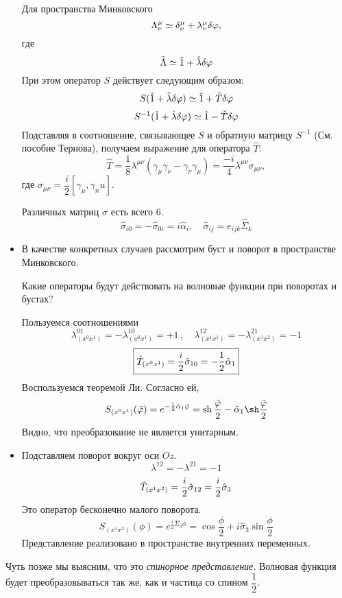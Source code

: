 \begin{itemize}
  Для пространства Минковского
  $$
    \Lambda_\nu^{\mu} \simeq \delta_\nu^{\mu} + \lambda_\nu^{\mu} \delta \varphi,
  $$
  где
  $$
    \hat \Lambda \simeq \hat 1 + \hat \lambda \delta \varphi
  $$
  При этом оператор $S$ действует следующим образом:
  $$
    S(\hat 1 + \hat \lambda \delta \varphi) \simeq \hat 1 + \hat T \delta \varphi
  $$
  $$
    S^{-1} (\hat 1 + \hat \lambda \delta \varphi) \simeq \hat 1 - \hat T \delta \varphi
  $$
  Подставляя в соотношение, связывающее $S$ и обратную матрицу $S^{-1}$ (См. пособие Тернова), получаем выражение для оператора $\hat T$:
  $$
    \hat T = \dfrac{1}{8} \lambda^{\mu\nu}
    (\gamma_\mu \gamma_\nu - \gamma_\nu \gamma_\mu) = \dfrac{-i}{4} \lambda^{\mu \nu} \sigma_{\mu \nu},
  $$
  где $\sigma_{\mu \nu} = \dfrac{i}{2}[\gamma_\mu, \gamma_nu]$.
  
  Различных матриц $\sigma$ есть всего 6.
  $$
    \hat \sigma_{i0} = - \hat \sigma_{0i} = i \hat \alpha_i, \quad \hat \sigma_{ij} = e_{ijk} \hat \Sigma_k
  $$
  \item В качестве конкретных случаев рассмотрим буст и поворот в пространстве Минковского.
  
  Какие операторы будут действовать на волновые функции при поворотах и бустах?
  
  Пользуемся соотношениями
  $$
    \boxed{
        \lambda_{(x^0 x^1)}^{01} = - \lambda_{(x^0 x^1)}^{10} = +1
    } \, , \quad 
    \boxed{
        \lambda_{(x^1 x^1)}^{12} = - \lambda_{(x^1 x^2)}^{21} = -1
    }
  $$
  $$
  \boxed{
    \Hat T_{(x^0 x^1)} = \dfrac{i}{2} \hat \sigma_{10} = -\dfrac{1}{2} \hat \alpha_1
  }
  $$
  Воспользуемся теоремой Ли. Согласно ей,
  $$
    S_{(x^0 x^1)} (\tilde \phi) = e^{-\frac{1}{2} \hat \alpha_1 \tilde \phi} = \ch \dfrac{\tilde \phi}{2}- \hat \alpha_1 \sh \dfrac{\tilde \phi}{2}
  $$
  Видно, что преобразование не является унитарным.
  \item Подставляем поворот вокруг оси $Oz$.
  $$
    \lambda^{12} = - \lambda^{21} = -1
  $$
  $$
    \Hat T_{(x^1 x^2)} = \dfrac{i}{2} \hat \sigma_{12} = \dfrac{i}{2} \hat \sigma_3
  $$
  Это оператор бесконечно малого поворота.
  $$
    S_{(x^1 x^2)}(\phi) = e^{\frac{i}{2} \hat \Sigma_3 \phi} = \cos \dfrac{\phi}{2} + i \hat \sigma_3 \sin \dfrac{\phi}{2}
  $$
  Представление реализовано в пространстве внутренних переменных.
\end{itemize}

Чуть позже мы выясним, что это \emph{спинорное представление}. Волновая функция будет преобразовываться так же, 
как и частица со спином $\dfrac{1}{2}$.


